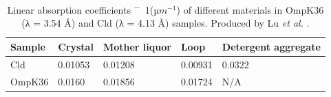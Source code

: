 



\begin{table}[]
\begin{tabular}{@{}lllll@{}}
\toprule
Sample & Crystal & Mother liquor & Loop    & Detergent aggregate \\ \midrule
Cld    & 0.01053 & 0.01208       & 0.00931 & 0.0322              \\
OmpK36 & 0.0160  & 0.01856       & 0.01724 & N/A                 \\ \bottomrule
\end{tabular}
\caption{Linear absorption coefficients \unit{\mu^-1}($µm^{−1}$) of different materials in OmpK36 (λ = 3.54 Å) and Cld (λ = 4.13 Å) samples. Produced by Lu \textit{et al.} \cite{Lu2024}.}
\label{Cld_Ompk_ACs}
\end{table}







